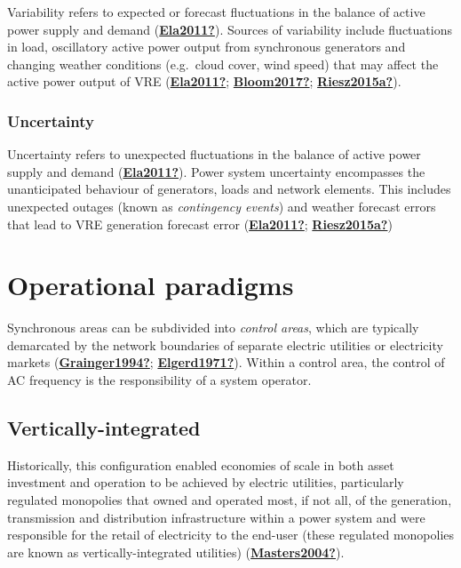 \documentclass[12pt,a4paper,]{report}
\begin{document}
Variability refers to expected or forecast fluctuations in the balance
of active power supply and demand
(\protect\hyperlink{ref-Ela2011}{\textbf{Ela2011?}}). Sources of
variability include fluctuations in load, oscillatory active power
output from synchronous generators and changing weather conditions
(e.g.~cloud cover, wind speed) that may affect the active power output
of VRE (\protect\hyperlink{ref-Ela2011}{\textbf{Ela2011?}};
\protect\hyperlink{ref-Bloom2017}{\textbf{Bloom2017?}};
\protect\hyperlink{ref-Riesz2015a}{\textbf{Riesz2015a?}}).

\hypertarget{uncertainty}{%
\subsubsection{Uncertainty}\label{uncertainty}}

Uncertainty refers to unexpected fluctuations in the balance of active
power supply and demand
(\protect\hyperlink{ref-Ela2011}{\textbf{Ela2011?}}). Power system
uncertainty encompasses the unanticipated behaviour of generators, loads
and network elements. This includes unexpected outages (known as
\emph{contingency events}) and weather forecast errors that lead to VRE
generation forecast error
(\protect\hyperlink{ref-Ela2011}{\textbf{Ela2011?}};
\protect\hyperlink{ref-Riesz2015a}{\textbf{Riesz2015a?}})

\hypertarget{sec:lit_review-operational_paradigms}{%
\section{Operational
paradigms}\label{sec:lit_review-operational_paradigms}}

Synchronous areas can be subdivided into \emph{control areas}, which are
typically demarcated by the network boundaries of separate electric
utilities or electricity markets
(\protect\hyperlink{ref-Grainger1994}{\textbf{Grainger1994?}};
\protect\hyperlink{ref-Elgerd1971}{\textbf{Elgerd1971?}}). Within a
control area, the control of AC frequency is the responsibility of a
system operator.

\hypertarget{vertically-integrated}{%
\subsection{Vertically-integrated}\label{vertically-integrated}}

Historically, this configuration enabled economies of scale in both
asset investment and operation to be achieved by electric utilities,
particularly regulated monopolies that owned and operated most, if not
all, of the generation, transmission and distribution infrastructure
within a power system and were responsible for the retail of electricity
to the end-user (these regulated monopolies are known as
vertically-integrated utilities)
(\protect\hyperlink{ref-Masters2004}{\textbf{Masters2004?}}).
\end{document}
